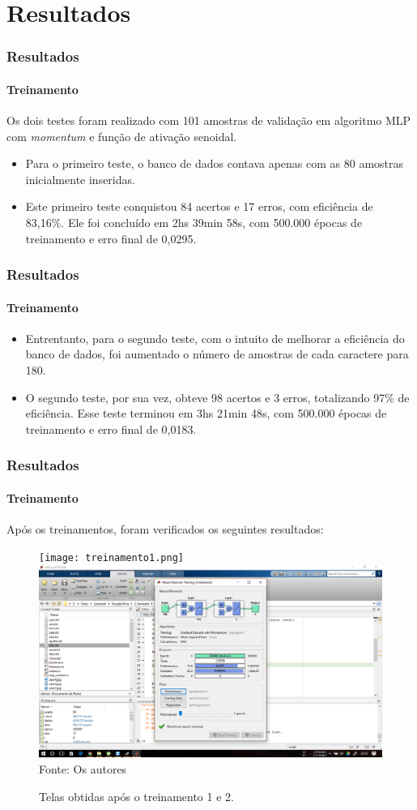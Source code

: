 
	
		\section{Resultados}
	\begin{frame}
	\frametitle{Resultados}
	\framesubtitle{Treinamento}
	Os dois testes foram realizado com 101 amostras de validação em algoritmo MLP com \textit{momentum} e função de ativação senoidal.
	\begin{itemize}
		\item Para o primeiro teste, o banco de dados contava apenas com as 80 amostras inicialmente inseridas.
		\item Este primeiro teste conquistou 84 acertos e 17 erros, com eficiência de 83,16\%. Ele foi concluído em 2hs 39min 58s, com 500.000 épocas de treinamento e erro final de 0,0295.
		
	\end{itemize}

	\end{frame}	


\begin{frame}
	\frametitle{Resultados}
	\framesubtitle{Treinamento}

	\begin{itemize}
		\item Entrentanto, para o segundo teste, com o intuito de melhorar a eficiência do banco de dados, foi aumentado o número de amostras de cada caractere para 180.
		\item O segundo teste, por sua vez, obteve 98 acertos e 3 erros, totalizando 97\% de eficiência. Esse teste terminou em 3hs 21min 48s, com 500.000 épocas de treinamento e erro final de 0,0183.
		
	\end{itemize}
	
\end{frame}	
	
	
	\begin{frame}
		\frametitle{Resultados}
		\framesubtitle{Treinamento}
		Após os treinamentos, foram verificados os seguintes resultados:
			\begin{figure}[H]
			\centering
			\caption{Telas obtidas após o treinamento 1 e 2.}
			\texttt{[image: treinamento1.png]}
			\quad
			\includegraphics[width=0.22 \linewidth]{treinamento.png}\\
			{\scriptsize Fonte: Os autores}
			\label{view}
		\end{figure} 
	\end{frame}

